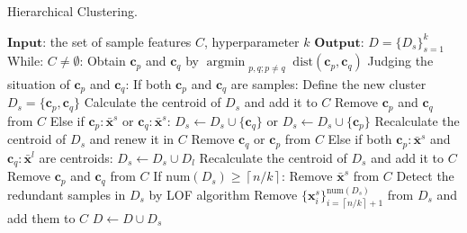 \documentclass[lettersize,journal]{IEEEtran}
\begin{document}
\begin{algorithm}[b!]
  \caption{Hierarchical Clustering.}\label{alg:alg1}
  \begin{algorithmic}
  \STATE 
  \STATE $\mathbf{Input}$: the set of sample features $C$, hyperparameter $k$
  \STATE $\mathbf{Output}$: $D=\{D_s\}_{s=1}^k$
  \vspace{5pt} %
  \STATE While: $C\neq\emptyset$:
  \STATE \hspace{0.5cm}Obtain $\boldsymbol{c}_p$ and $\boldsymbol{c}_q$ by $\mathop{\text{argmin}}_{\substack{p, q ; p \neq  {q}}}\text{dist}(\boldsymbol{c}_p,\boldsymbol{c}_q)$
  \STATE \hspace{0.5cm}Judging the situation of $\boldsymbol{c}_p$ and $\boldsymbol{c}_q$:
  \STATE \hspace{1.0cm}If both $\boldsymbol{c}_p$ and $\boldsymbol{c}_q$ are samples:
  \STATE \hspace{1.5cm}Define the new cluster $D_s=\{\boldsymbol{c}_p,\boldsymbol{c}_q\}$
  \STATE \hspace{1.5cm}Calculate the centroid of $D_s$ and add it to $C$
  \STATE \hspace{1.5cm}Remove $\boldsymbol{c}_p$ and $\boldsymbol{c}_q$ from $C$
  \STATE \hspace{1.0cm}Else if $\boldsymbol{c}_p:\bar{\boldsymbol{x}}^s$ or $\boldsymbol{c}_q:{\bar{\boldsymbol{x}}^s}$:
  \STATE \hspace{1.5cm}$D_s\leftarrow D_s {\cup} \{{\boldsymbol{c}}_q\}$ or $D_s\leftarrow D_s {\cup} \{{\boldsymbol{c}}_p\}$
  \STATE \hspace{1.5cm}Recalculate the centroid of $D_s$ and renew it
  \STATE \hspace{1.5cm}in $C$
  \STATE \hspace{1.5cm}Remove $\boldsymbol{c}_q$ or $\boldsymbol{c}_p$ from $C$
  \STATE \hspace{1.0cm}Else if both $\boldsymbol{c}_p:{\bar{\boldsymbol{x}}^s}$ and $\boldsymbol{c}_q:{\bar{\boldsymbol{x}}^l}$ are centroids:
  \STATE \hspace{1.5cm}$D_s \leftarrow D_s  {\cup}  D_l$
  \STATE \hspace{1.5cm}Recalculate the centroid of $D_s$ and add it
  \STATE \hspace{1.5cm}to $C$
  \STATE \hspace{1.5cm}Remove $\boldsymbol{c}_p$ and $\boldsymbol{c}_q$ from $C$
  \STATE \hspace{0.5cm}If $\text{num}(D_s)\ge \left\lceil n/k\right\rceil$:
  \STATE \hspace{1.0cm}Remove $\bar{\boldsymbol{x}}^s$ from $C$
  \STATE \hspace{1.0cm}Detect the redundant samples in $D_s$ by LOF
  \STATE \hspace{1.0cm}algorithm
  \STATE \hspace{1.0cm}Remove $\{\boldsymbol{x}^s_i\}_{i=\left\lceil n/k\right\rceil+1}^{\text{num}(D_s)}$ from $D_s$ and add them to
  \STATE \hspace{1.0cm}$C$
  \STATE \hspace{1.0cm}$D \leftarrow D  {\cup}  D_s$
  \end{algorithmic}
  \label{Alg1}
\end{algorithm}
\end{document}
